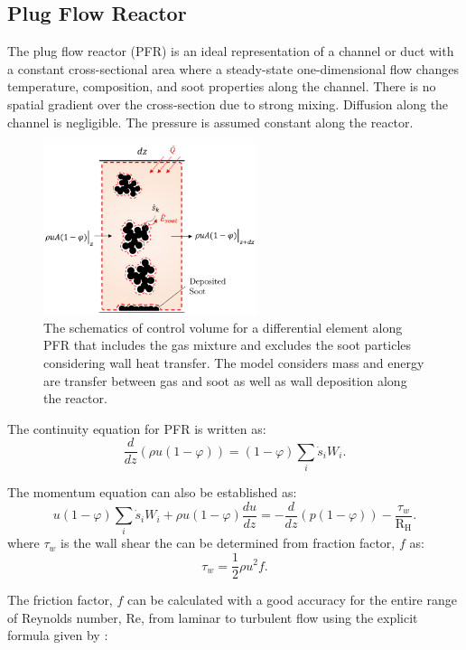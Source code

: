 \subsection{Plug Flow Reactor}
The plug flow reactor (PFR) is an ideal representation of a channel or duct with a constant cross-sectional area where a steady-state one-dimensional flow changes temperature, composition, and soot properties along the channel. There is no spatial gradient over the cross-section due to strong mixing. Diffusion along the channel is negligible. The pressure is assumed constant along the reactor.
\begin{figure}[!htbp]
	\centering
	\includegraphics[height=50mm, ]{Figures/Theory/PFR.pdf}
	\caption{The schematics of control volume for a differential element along PFR that includes the gas mixture and excludes the soot particles considering wall heat transfer. The model considers mass and energy are transfer between gas and soot as well as wall deposition along the reactor.}
	\label{fig:pfrcv}
\end{figure}


The continuity equation for PFR is written as:
\begin{equation}
	\frac{d}{dz}(\rho u(1-\varphi)) =(1-\varphi) \sum_i \dot s_i W_i
	\label{eqn:contpfr}.
\end{equation}

The momentum equation can also be established as:
\begin{equation}
	u (1-\varphi) \sum_i \dot s_i W_i + \rho u (1-\varphi) \frac{du}{dz}
	=-\frac{d}{dz}(p(1-\varphi))-\frac{\tau_{w}}{\mathrm{R_H}} 
	\label{eqn:momenpfr}.
\end{equation}
\noindent where $\tau_w$ is the wall shear the can be determined from fraction factor, $f$ as:
\begin{equation}
	\tau_w = \frac{1}{2}\rho u^2 f 
	\label{eqn:wallshearpfr}.
\end{equation}

The friction factor, $f$ can be calculated with a good accuracy for the entire range of Reynolds number, Re, from laminar to turbulent flow using the explicit formula given by \citet{haaland1983simple}:

